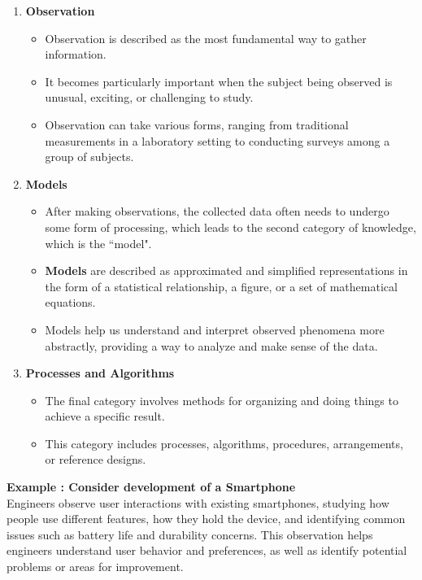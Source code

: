 \documentclass{article}
\begin{document}
	\begin{enumerate}[label=\textbf{\roman*)}]
		\item \textbf{Observation}
			\begin{itemize}
				\item Observation is described as the most fundamental way to gather information.
				\item It becomes particularly important when the subject being observed is unusual, exciting,
					or challenging to study.
				\item Observation can take various forms, ranging from traditional measurements in a laboratory
					setting to conducting surveys among a group of subjects.
			\end{itemize}
		\item \textbf{Models}
			\begin{itemize}
				\item After making observations, the collected data often needs to undergo some form of
					processing, which leads to the second category of knowledge, which is the ``model".
				\item \textbf{Models} are described as approximated and simplified representations in the form
					of a statistical relationship, a figure, or a set of mathematical equations.
				\item Models help us understand and interpret observed phenomena more abstractly, providing a
					way to analyze and make sense of the data.
			\end{itemize}
		\item \textbf{Processes and Algorithms}
			\begin{itemize}
				\item The final category involves methods for organizing and doing things to achieve a
					specific result.
				\item This category includes processes, algorithms, procedures, arrangements, or reference
					designs.
			\end{itemize}
	\end{enumerate}

	\noindent \textbf{Example : Consider development of a Smartphone} \\
	Engineers observe user interactions with existing smartphones, studying how people use different features,
	how they hold the device, and identifying common issues such as battery life and durability concerns.
	This observation helps engineers understand user behavior and preferences, as well as identify potential
	problems or areas for improvement. \\
\end{document}
